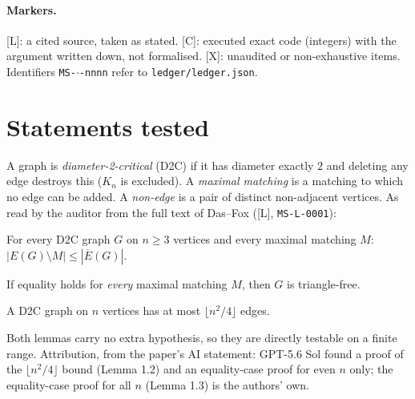 \documentclass[10pt]{article}
\newcommand{\tier}[1]{\textsf{[#1]}}
\newcommand{\tL}{\tier{L}}
\newcommand{\tC}{\tier{C}}
\newcommand{\tX}{\tier{X}}
\begin{document}
\paragraph{Markers.} \tL{}: a cited source, taken as stated. \tC{}: executed exact code (integers) with the argument written down, not formalised. \tX{}: unaudited or non-exhaustive items. Identifiers \texttt{MS-$\cdot$-nnnn} refer to \texttt{ledger/ledger.json}.

\section{Statements tested}\label{sec:def}
A graph is \emph{diameter-2-critical} (D2C) if it has diameter exactly $2$ and deleting any edge destroys this ($K_n$ is excluded). A \emph{maximal matching} is a matching to which no edge can be added. A \emph{non-edge} is a pair of distinct non-adjacent vertices. As read by the auditor from the full text of Das--Fox \cite{df} (\tL{}, \texttt{MS-L-0001}):
\begin{description}\itemsep=1pt
\item[Lemma 1.2.] For every D2C graph $G$ on $n\ge3$ vertices and every maximal matching $M$: $|E(G)\setminus M|\le|\overline{E}(G)|$.
\item[Lemma 1.3.] If equality holds for \emph{every} maximal matching $M$, then $G$ is triangle-free.
\item[Theorem 1.1.] A D2C graph on $n$ vertices has at most $\lfloor n^2/4\rfloor$ edges.
\end{description}
Both lemmas carry no extra hypothesis, so they are directly testable on a finite range. Attribution, from the paper's AI statement: GPT-5.6 Sol found a proof of the $\lfloor n^2/4\rfloor$ bound (Lemma 1.2) and an equality-case proof for even $n$ only; the equality-case proof for all $n$ (Lemma 1.3) is the authors' own.
\end{document}
